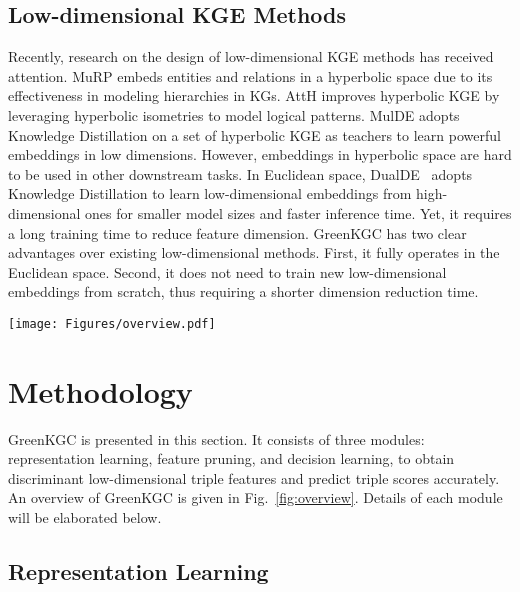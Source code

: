 \documentclass{article}
\begin{document}
\subsection{Low-dimensional KGE Methods}

Recently, research on the design of low-dimensional KGE methods has
received attention. MuRP \citep{balazevic2019multi} embeds entities
and relations in a hyperbolic space due to its effectiveness in modeling 
hierarchies in KGs. AttH \citep{chami2020low} improves hyperbolic KGE 
by leveraging hyperbolic isometries to model logical patterns. MulDE 
\citep{wang2021mulde} adopts Knowledge Distillation \citep{hinton2015distill} 
on a set of hyperbolic KGE as teachers to learn powerful embeddings in low dimensions.
However, embeddings in hyperbolic space are hard to be used in other downstream tasks.
In Euclidean space, DualDE~\citep{zhu2022dualde} adopts Knowledge Distillation 
to learn low-dimensional embeddings from high-dimensional ones for smaller model
sizes and faster inference time. Yet, it requires a long training time
to reduce feature dimension.
GreenKGC has two clear advantages over existing low-dimensional methods. 
First, it fully operates in the Euclidean space. Second, it does not 
need to train new low-dimensional embeddings from scratch, thus requiring
a shorter dimension reduction time. 

\begin{figure*}[t]
\centering
\texttt{[image: Figures/overview.pdf]}
\caption{An overview of GreenKGC, which consists of three modules: (a)
representation learning, (b) feature pruning, and (c) decision learning.} 
\label{fig:overview}
\end{figure*}


\section{Methodology}\label{sec:method}

GreenKGC is presented in this section. It consists of three modules:
representation learning, feature pruning, and decision learning, to
obtain discriminant low-dimensional triple features and predict triple
scores accurately.  An overview of GreenKGC is given in Fig.~\ref{fig:overview}. Details of each module will be elaborated below. 

\subsection{Representation Learning}\label{subsec:representation}
\end{document}
